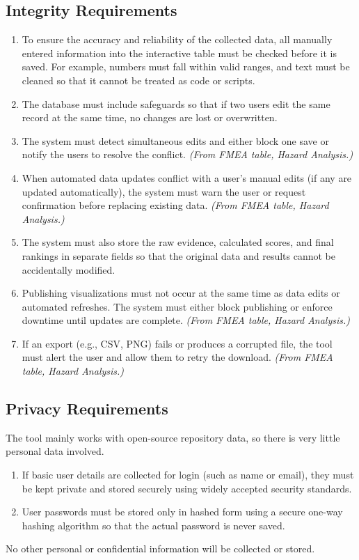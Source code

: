 \documentclass[12pt]{article}
\begin{document}
\subsection{Integrity Requirements}
\begin{enumerate}[label=SR-INT\arabic*]
\item To ensure the accuracy and reliability of the collected data, all manually entered information into the interactive table must be checked before it is saved. For example, numbers must fall within valid ranges, and text must be cleaned so that it cannot be treated as code or scripts.
\item The database must include safeguards so that if two users edit the same record at the same time, no changes are lost or overwritten.
\item The system must detect simultaneous edits and either block one save or notify the users to resolve the conflict. \textit{(From FMEA table, Hazard Analysis.)}
\item When automated data updates conflict with a user’s manual edits (if any are updated automatically), the system must warn the user or request confirmation before replacing existing data. \textit{(From FMEA table, Hazard Analysis.)}
\item The system must also store the raw evidence, calculated scores, and final rankings in separate fields so that the original data and results cannot be accidentally modified.
\item Publishing visualizations must not occur at the same time as data edits or automated refreshes. The system must either block publishing or enforce downtime until updates are complete. \textit{(From FMEA table, Hazard Analysis.)}
\item If an export (e.g., CSV, PNG) fails or produces a corrupted file, the tool must alert the user and allow them to retry the download. \textit{(From FMEA table, Hazard Analysis.)}
\end{enumerate}
\subsection{Privacy Requirements}
The tool mainly works with open-source repository data, so there is very little personal data involved.
\begin{enumerate}[label=SR-P\arabic*]
\item If basic user details are collected for login (such as name or email), they must be kept private and stored securely using widely accepted security standards.
\item User passwords must be stored only in hashed form using a secure one-way hashing algorithm so that the actual password is never saved.
\end{enumerate}
No other personal or confidential information will be collected or stored.
\end{document}
